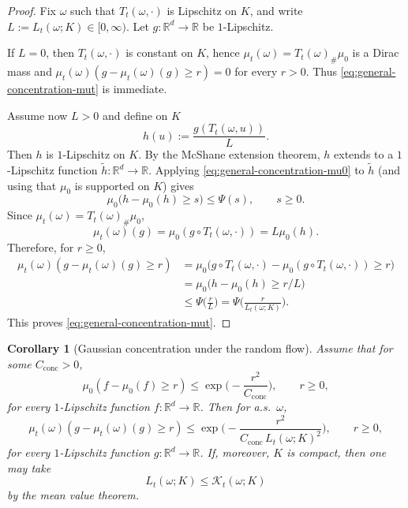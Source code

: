 \documentclass{tsp-short}
\newtheorem{corollary}{Corollary}[section]
\theoremstyle{remark}
\theoremstyle{definition}
\begin{document}
\begin{proof}
Fix $\omega$ such that $T_t(\omega,\cdot)$ is Lipschitz on $K$, and write
\(L:=L_t(\omega;K)\in[0,\infty)\).
Let $g:\mathbb{R}^d\to\mathbb{R}$ be $1$-Lipschitz.

If $L=0$, then $T_t(\omega,\cdot)$ is constant on $K$, hence
\(\mu_t(\omega)=T_t(\omega)_{\#}\mu_0\) is a Dirac mass and
\(\mu_t(\omega)(g-\mu_t(\omega)(g)\ge r)=0\) for every $r>0$.
Thus \eqref{eq:general-concentration-mut} is immediate.

Assume now $L>0$ and define on $K$
\[
h(u):=\frac{g(T_t(\omega,u))}{L}.
\]
Then $h$ is $1$-Lipschitz on $K$.
By the McShane extension theorem, $h$ extends to a $1$-Lipschitz function
\(\widetilde h:\mathbb{R}^d\to\mathbb{R}\).
Applying \eqref{eq:general-concentration-mu0} to $\widetilde h$ (and using that $\mu_0$ is supported on $K$) gives
\[
\mu_0\big(h-\mu_0(h)\ge s\big)\le \Psi(s),\qquad s\ge0.
\]
Since $\mu_t(\omega)=T_t(\omega)_{\#}\mu_0$,
\[
\mu_t(\omega)(g)=\mu_0(g\circ T_t(\omega,\cdot))=L\mu_0(h).
\]
Therefore, for $r\ge0$,
\begin{align*}
\mu_t(\omega)(g-\mu_t(\omega)(g)\ge r)
&= \mu_0\big(g\circ T_t(\omega,\cdot)-\mu_0(g\circ T_t(\omega,\cdot))\ge r\big)\\
&= \mu_0\big(h-\mu_0(h)\ge r/L\big)\\
&\le \Psi\Big(\frac{r}{L}\Big)
= \Psi\Big(\frac{r}{L_t(\omega;K)}\Big).
\end{align*}
This proves \eqref{eq:general-concentration-mut}.
\end{proof}

\begin{corollary}[Gaussian concentration under the random flow]\label{cor:gaussian-concentration-transfer}
Assume that for some $C_{\mathrm{conc}}>0$,
\begin{equation}\label{eq:gaussian-concentration-mu0}
\mu_0(f-\mu_0(f)\ge r)\le \exp\Big(-\frac{r^2}{C_{\mathrm{conc}}}\Big),
\qquad r\ge0,
\end{equation}
for every $1$-Lipschitz function $f:\mathbb{R}^d\to\mathbb{R}$.
Then for a.s.\ $\omega$,
\begin{equation*}
\mu_t(\omega)(g-\mu_t(\omega)(g)\ge r)
\le
\exp\Big(-\frac{r^2}{C_{\mathrm{conc}}\,L_t(\omega;K)^2}\Big),
\qquad r\ge0,
\end{equation*}
for every $1$-Lipschitz function $g:\mathbb{R}^d\to\mathbb{R}$.
If, moreover, $K$ is compact, then one may take
\begin{equation*}
L_t(\omega;K)\le \mathcal K_t(\omega;K)
\end{equation*}
by the mean value theorem.
\end{corollary}
\end{document}
